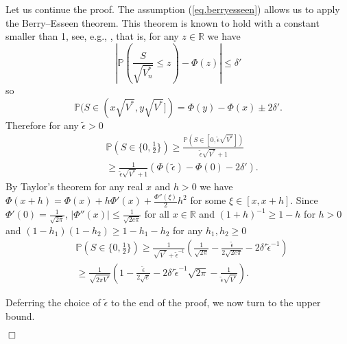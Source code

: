 \documentclass{article}
\newenvironment{proofof}[1]{\noindent {\bf Proof of #1}}{\hspace*{\fill}$\Box$}
\newcommand{\pr}{\mathbb P}
\begin{document}
\begin{proofof}{Lemma~\ref{lem.clt}}
    Let us continue the proof. The assumption (\ref{eq.berryesseen}) allows us to apply the Berry--Esseen theorem. This theorem is known to hold with a constant smaller than 1, see, e.g., \cite{shevtsova}, that is, for any $z \in \mathbb{R}$ we have
\[
    |\pr(\frac{S}{\sqrt{V_{n}^*}} \le z) - \Phi(z)| \le \delta' 
\]
so
\[
    \pr(S \in (x \sqrt {V^*}, y \sqrt{V^*}]) = \Phi(y) - \Phi(x) \pm 2 \delta'.
\]
    Therefore for any $\tilde{\epsilon} > 0$
\begin{align*}
    &\pr(S \in \{0,\frac 1 2\}) \ge \frac {\pr(S \in [0, \tilde{\epsilon} \sqrt{V^*}])} {\tilde{\epsilon} \sqrt {V^*}+1}
    \\  & \ge \frac 1 {\tilde{\epsilon} \sqrt{V^*}+1} (\Phi(\tilde{\epsilon}) - \Phi(0) - 2 \delta').
\end{align*}
    By Taylor's theorem for any real $x$ and $h > 0$ we have  $\Phi(x+h) = \Phi(x) + h \Phi'(x) + \frac{\Phi''(\xi)} 2 h^2$ for
    some $\xi \in [x, x+h]$. Since $\Phi'(0)=\frac 1 {\sqrt {2 \pi}}$, $|\Phi''(x)| \le \frac 1 {\sqrt {2 e \pi}}$ for all $x \in \mathbb{R}$
    and $(1 + h)^{-1} \ge 1 - h$ for $h > 0$ and $(1-h_1) (1-h_2) \ge 1-h_1-h_2$ for any $h_1, h_2 \ge 0$
\begin{align}\label{eq.extremal_local_lower}
        &\pr(S \in \{0,\frac 1 2\}) \ge \frac 1 {\sqrt {V^*} + \tilde{\epsilon}^{-1}} \left(\frac 1 {\sqrt {2 \pi}}  - \frac {\tilde{\epsilon}} {2 \sqrt {2 e \pi}} - 2 \delta' \tilde{\epsilon}^{-1} \right) \nonumber
        \\ &
         \ge \frac 1 {\sqrt {2 \pi V^*}} \left(1  - \frac {\tilde{\epsilon}} {2 \sqrt {e}} - 2 \delta' \tilde{\epsilon}^{-1} {\sqrt {2 \pi}} - \frac 1 {\tilde{\epsilon} \sqrt{V^*}} \right )
        .
\end{align}

    Deferring the choice of $\tilde{\epsilon}$ to the end of the proof, we now turn to the upper bound.


\end{proofof}
\end{document}
